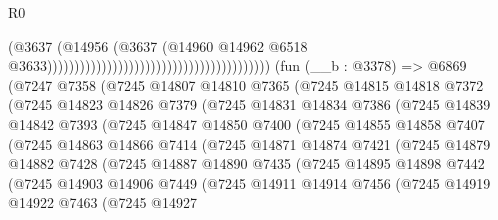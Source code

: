 \begin{lexlean}{R0}
\begin{coremodule}
                                                                              (@3637
                                                                                (@14956
                                                                                  (@3637
                                                                                    (@14960
                                                                                      @14962
                                                                                      @6518
                                                                                      @3633)))))))))))))))))))))))))))))))))))))))))
    (fun (__b : @3378) =>
    @6869
      (@7247
        @7358
        (@7245
          @14807
          @14810
          @7365
          (@7245
            @14815
            @14818
            @7372
            (@7245
              @14823
              @14826
              @7379
              (@7245
                @14831
                @14834
                @7386
                (@7245
                  @14839
                  @14842
                  @7393
                  (@7245
                    @14847
                    @14850
                    @7400
                    (@7245
                      @14855
                      @14858
                      @7407
                      (@7245
                        @14863
                        @14866
                        @7414
                        (@7245
                          @14871
                          @14874
                          @7421
                          (@7245
                            @14879
                            @14882
                            @7428
                            (@7245
                              @14887
                              @14890
                              @7435
                              (@7245
                                @14895
                                @14898
                                @7442
                                (@7245
                                  @14903
                                  @14906
                                  @7449
                                  (@7245
                                    @14911
                                    @14914
                                    @7456
                                    (@7245
                                      @14919
                                      @14922
                                      @7463
                                      (@7245
                                        @14927

\end{coremodule}
\end{lexlean}

